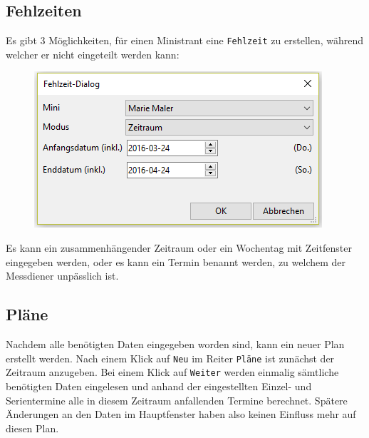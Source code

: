 \documentclass[a4paper,11pt]{article}
\begin{document}
\subsection{Fehlzeiten}
Es gibt 3 Möglichkeiten, für einen Ministrant eine \texttt{Fehlzeit} zu erstellen, während welcher er nicht eingeteilt werden kann:
\begin{figure}[ht]
\includegraphics[scale=0.6]{fehlzeit2.PNG}
\end{figure}

Es kann ein zusammenhängender Zeitraum oder ein Wochentag mit Zeitfenster eingegeben werden, oder es kann ein Termin benannt werden, zu welchem der Messdiener unpässlich ist.
\subsection{Pläne}
Nachdem alle benötigten Daten eingegeben worden sind, kann ein neuer Plan erstellt werden. Nach einem Klick auf \texttt{Neu} im Reiter \texttt{Pläne} ist zunächst der Zeitraum anzugeben. Bei einem Klick auf \texttt{Weiter} werden einmalig sämtliche benötigten Daten eingelesen und anhand der eingestellten Einzel- und Serientermine alle in diesem Zeitraum anfallenden Termine berechnet. Spätere Änderungen an den Daten im Hauptfenster haben also keinen Einfluss mehr auf diesen Plan. 
\end{document}
